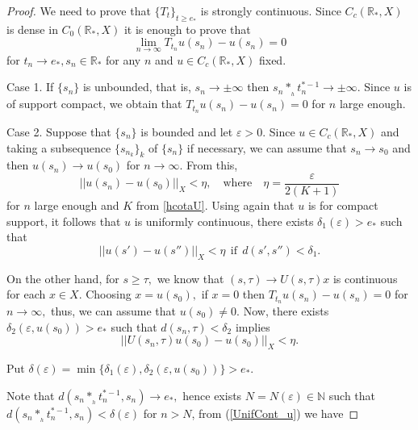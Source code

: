 \documentclass[10pt]{amsart}
\numberwithin{equation}{section}
\begin{document}
\begin{proof}
\medskip

We need to prove that $\{T_t\}_{t\ge e_*}$ is strongly continuous. Since $C_c(\mathbb{R}_*, X)$ is dense in $C_0(\mathbb{R}_*, X)$  it is enough to prove that
$$
\lim_{n \to \infty} T_{t_n}u(s_n) - u(s_n) = 0 
$$
for $t_n \to e_*, s_n \in \mathbb{R}_*$ for any $n$ and $u \in C_c(\mathbb{R}_*, X)$ fixed. 

\medskip

Case 1. If $\{s_n\}$ is unbounded, that is, $s_n \to \pm \infty$ then $s_n*_{_h} t_n^{*-1} \to \pm \infty.$ Since $u$ is of support compact, we obtain that  $T_{t_n}u(s_n) - u(s_n) = 0$ for $n$ large enough.

\medskip

Case 2. Suppose that $\{s_n\}$ is bounded and let $\varepsilon > 0.$ Since $u \in C_c(\mathbb{R}_*, X)$ and taking a subsequence $\{s_{n_k}\}_k$ of  $\{s_n\}$   if necessary, we can assume that $s_n \to s_0$ and then $u(s_n) \to u(s_0)$ for $n \to \infty.$ From this, 
\begin{equation}\label{cont_u}
||u(s_n) - u(s_0)||_X < \eta, \quad \mbox{where} \quad \eta  = \frac{\varepsilon}{2(K + 1)}
\end{equation}
for $n$ large enough and $K$ from \eqref{hcotaU}. Using again that $u$ is for compact support, it follows that $u$ is uniformly continuous, there exists $\delta_1(\varepsilon) > e_*$ such that 
\begin{equation}\label{UnifCont_u}
||u(s') - u(s'')||_X < \eta \ \ \mbox{if} \ \ d(s',s'') < \delta_1.
\end{equation}


\medskip

On the other hand, for $s \ge \tau,$  we know that $(s,\tau) \to U(s,\tau)x$ is continuous for each $x \in X.$ Choosing $x = u(s_0),$ if $x = 0$ then $T_{t_n}u(s_n) - u(s_n) = 0$ for $n \to \infty,$ thus, we can assume that $u(s_0) \ne 0.$ Now,  there exists $\delta_2(\varepsilon, u(s_0)) > e_*$ such that $d(s_n,\tau) < \delta_2$ implies
\begin{equation}\label{Cont_U}
||U(s_n, \tau) u(s_0) - u(s_0)||_X < \eta.
\end{equation}


Put $\delta(\varepsilon) = \min\{ \delta_1(\varepsilon), \delta_2(\varepsilon, u(s_0))\}  > e_*.$

\medskip

\noindent Note that  $d(s_n*_{_h}t_n^{*-1}, s_n) \to e_*,$ hence exists $N = N(\varepsilon) \in \mathbb{N}$ such that $d(s_n*_{_h}t_n^{*-1}, s_n) < \delta(\varepsilon)$ for $n > N$,
from (\ref{UnifCont_u})  we have


\end{proof}
\end{document}

